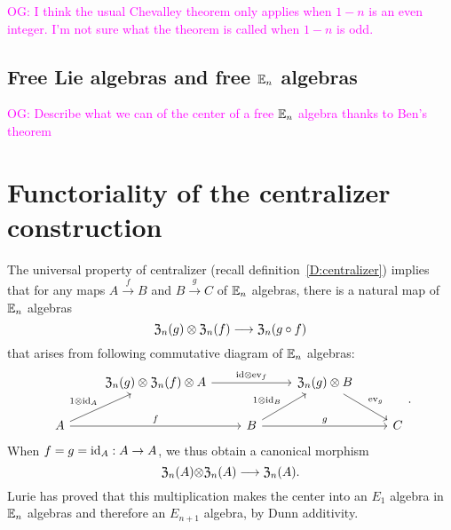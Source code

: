 \documentclass[11pt]{amsart}
\numberwithin{equation}{section}
\def\owen{\textcolor{magenta}{OG: }\textcolor{magenta}}
\begin{document}
\owen{I think the usual Chevalley theorem only applies when $1-n$ is an even integer. I'm not sure what the theorem is called when $1-n$ is odd.}

\subsection{Free Lie algebras and free $\mathbb E_n$ algebras}

\owen{Describe what we can of the center of a free $\mathbb E_n$ algebra thanks to Ben's theorem}

\section{Functoriality of the centralizer construction}
\label{S:centerinFacAlg}

The universal property of centralizer (recall definition~\ref{D:centralizer}) implies that 
for any maps $A\stackrel{f}\to B$ and $B\stackrel{g}\to C$ of $\mathbb E_n$ algebras, 
there is a natural map of $\mathbb E_n$ algebras
\begin{equation}
\label{eqdef:canonicaltocentralizers} 
{\frak Z}_n(g) \otimes {\frak Z}_n(f) \longrightarrow {\frak Z}_n(g\circ f)
\end{equation}
that arises from following commutative diagram of $\mathbb E_n$ algebras:
\[
\begin{tikzcd}
&   {\frak Z}_n(g) \otimes  {\frak Z}_n(f) \otimes A \arrow[rr, "\id\otimes \ev_f"] &&  {\frak Z}_n(g) \otimes  B \arrow[dr, "\ev_g"]\\
A \arrow[ur, "1\otimes \id_A"] \arrow[rr, "f"] && B \arrow[rr, "g"] \arrow[ur, "1\otimes \id_B"] && C 
\end{tikzcd}.
\]
When $f=g={\rm id}_A:A\to A$, we thus obtain a canonical morphism 
\begin{equation} 
\label{eq:dgAssofcenter}
{\frak Z}_n(A){\otimes} {\frak Z}_n(A) \longrightarrow {\frak Z}_n(A).
\end{equation}
Lurie \cite{HA} has proved that this multiplication makes the center into an $E_1$ algebra in $\mathbb E_n$ algebras 
and therefore an $E_{n+1}$ algebra, by Dunn additivity. 
%
\end{document}
